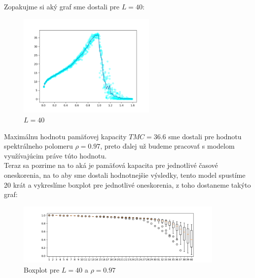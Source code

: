\documentclass[a4paper]{article}
\begin{document}
	Zopakujme si aký graf sme dostali pre $L=40$:
	
	\begin{figure}[!h]
		\centering
		\includegraphics[width=0.6\textwidth]{../L_40.png}
		\caption{$L=40$}
	\end{figure}

	Maximálnu hodnotu pamäťovej kapacity $TMC=36.6$ sme dostali pre hodnotu spektrálneho polomeru $\rho=0.97$, preto ďalej už budeme pracovať s modelom využívajúcim práve túto hodnotu. 
	\\
	
	Teraz sa pozrime na to aká je pamäťová kapacita pre jednotlivé časové oneskorenia, na to aby sme dostali hodnotnejšie výsledky, tento model spustíme 20 krát a vykreslíme boxplot pre jednotlivé oneskorenia, z toho dostaneme takýto graf:
	
	\begin{figure}[!h]
		\centering
		\includegraphics[width=0.9\textwidth]{../box_L_40.png}
		\caption{Boxplot pre $L=40$ a $\rho=0.97$}
	\end{figure}
	
\end{document}

